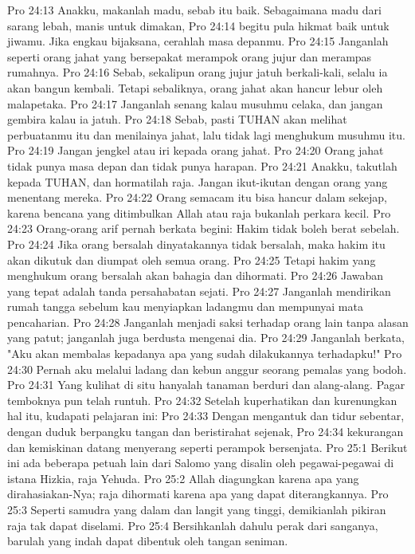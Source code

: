 Pro 24:13  Anakku, makanlah madu, sebab itu baik. Sebagaimana madu dari sarang lebah, manis untuk dimakan,
Pro 24:14  begitu pula hikmat baik untuk jiwamu. Jika engkau bijaksana, cerahlah masa depanmu.
Pro 24:15  Janganlah seperti orang jahat yang bersepakat merampok orang jujur dan merampas rumahnya.
Pro 24:16  Sebab, sekalipun orang jujur jatuh berkali-kali, selalu ia akan bangun kembali. Tetapi sebaliknya, orang jahat akan hancur lebur oleh malapetaka.
Pro 24:17  Janganlah senang kalau musuhmu celaka, dan jangan gembira kalau ia jatuh.
Pro 24:18  Sebab, pasti TUHAN akan melihat perbuatanmu itu dan menilainya jahat, lalu tidak lagi menghukum musuhmu itu.
Pro 24:19  Jangan jengkel atau iri kepada orang jahat.
Pro 24:20  Orang jahat tidak punya masa depan dan tidak punya harapan.
Pro 24:21  Anakku, takutlah kepada TUHAN, dan hormatilah raja. Jangan ikut-ikutan dengan orang yang menentang mereka.
Pro 24:22  Orang semacam itu bisa hancur dalam sekejap, karena bencana yang ditimbulkan Allah atau raja bukanlah perkara kecil.
Pro 24:23  Orang-orang arif pernah berkata begini: Hakim tidak boleh berat sebelah.
Pro 24:24  Jika orang bersalah dinyatakannya tidak bersalah, maka hakim itu akan dikutuk dan diumpat oleh semua orang.
Pro 24:25  Tetapi hakim yang menghukum orang bersalah akan bahagia dan dihormati.
Pro 24:26  Jawaban yang tepat adalah tanda persahabatan sejati.
Pro 24:27  Janganlah mendirikan rumah tangga sebelum kau menyiapkan ladangmu dan mempunyai mata pencaharian.
Pro 24:28  Janganlah menjadi saksi terhadap orang lain tanpa alasan yang patut; janganlah juga berdusta mengenai dia.
Pro 24:29  Janganlah berkata, "Aku akan membalas kepadanya apa yang sudah dilakukannya terhadapku!"
Pro 24:30  Pernah aku melalui ladang dan kebun anggur seorang pemalas yang bodoh.
Pro 24:31  Yang kulihat di situ hanyalah tanaman berduri dan alang-alang. Pagar temboknya pun telah runtuh.
Pro 24:32  Setelah kuperhatikan dan kurenungkan hal itu, kudapati pelajaran ini:
Pro 24:33  Dengan mengantuk dan tidur sebentar, dengan duduk berpangku tangan dan beristirahat sejenak,
Pro 24:34  kekurangan dan kemiskinan datang menyerang seperti perampok bersenjata.
Pro 25:1  Berikut ini ada beberapa petuah lain dari Salomo yang disalin oleh pegawai-pegawai di istana Hizkia, raja Yehuda.
Pro 25:2  Allah diagungkan karena apa yang dirahasiakan-Nya; raja dihormati karena apa yang dapat diterangkannya.
Pro 25:3  Seperti samudra yang dalam dan langit yang tinggi, demikianlah pikiran raja tak dapat diselami.
Pro 25:4  Bersihkanlah dahulu perak dari sanganya, barulah yang indah dapat dibentuk oleh tangan seniman.
